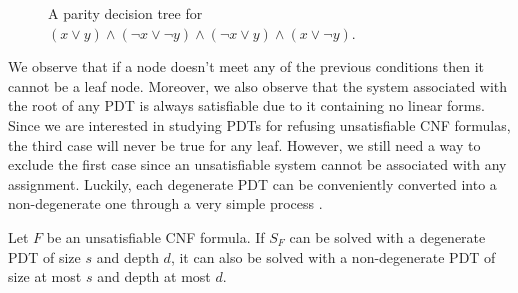 \begin{figure}[H]
    \centering


    \caption{A parity decision tree for $(x \lor y) \land (\lnot x \lor \lnot y) \land (\lnot x \lor y) \land (x \lor \lnot y)$.}
\end{figure}

\noindent
We observe that if a node doesn't meet any of the previous conditions then it cannot be a leaf node. Moreover, we also observe that the system associated with the root of any PDT is always satisfiable due to it containing no linear forms. Since we are interested in studying PDTs for refusing unsatisfiable CNF formulas, the third case will never be true for any leaf. However, we still need a way to exclude the first case since an unsatisfiable system cannot be associated with any assignment. Luckily, each degenerate PDT can be conveniently converted into a non-degenerate one through a very simple process \cite{res_lin_2}.

\begin{proposition}
    \label{degenerate}
 Let $F$ be an unsatisfiable CNF formula. If $S_F$ can be solved with a degenerate PDT of size $s$ and depth $d$, it can also be solved with a non-degenerate PDT of size at most $s$ and depth at most $d$.
\end{proposition}

